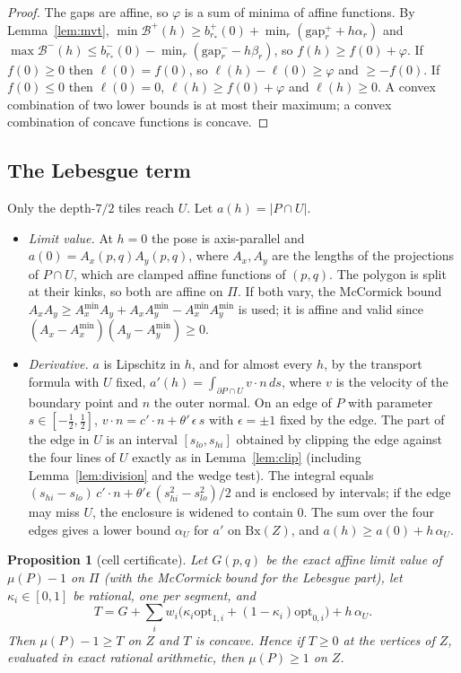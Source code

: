 \documentclass[11pt]{amsart}
\newtheorem{proposition}[theorem]{Proposition}
\theoremstyle{definition}
\theoremstyle{remark}
\newcommand{\gap}{\mathrm{gap}}
\newcommand{\opt}{\mathrm{opt}}
\newcommand{\Bx}{\mathrm{Bx}}
\begin{document}
\begin{proof}
The gaps are affine, so $\varphi$ is a sum of minima of affine functions. By Lemma~\ref{lem:mvt},
$\min\mathcal B^+(h)\ge b^+_{r_*}(0)+\min_r(\gap_r^++h\alpha_r)$ and $\max\mathcal B^-(h)\le
b^-_{r_*}(0)-\min_r(\gap^-_r-h\beta_r)$, so $f(h)\ge f(0)+\varphi$. If $f(0)\ge0$ then $\ell(0)=f(0)$, so
$\ell(h)-\ell(0)\ge\varphi$ and $\ge-f(0)$. If $f(0)\le0$ then $\ell(0)=0$, $\ell(h)\ge f(0)+\varphi$ and
$\ell(h)\ge0$. A convex combination of two lower bounds is at most their maximum; a convex combination of concave
functions is concave.
\end{proof}

\subsection{The Lebesgue term}
Only the depth-$7/2$ tiles reach $U$. Let $a(h)=|P\cap U|$.
\begin{itemize}
\item \emph{Limit value.} At $h=0$ the pose is axis-parallel and $a(0)=A_x(p,q)A_y(p,q)$, where $A_x,A_y$ are the
lengths of the projections of $P\cap U$, which are clamped affine functions of $(p,q)$. The polygon is split at
their kinks, so both are affine on $\Pi$. If both vary, the McCormick bound
$A_xA_y\ge A_x^{\min}A_y+A_xA_y^{\min}-A_x^{\min}A_y^{\min}$ is used; it is affine and valid since
$(A_x-A_x^{\min})(A_y-A_y^{\min})\ge0$.
\item \emph{Derivative.} $a$ is Lipschitz in $h$, and for almost every $h$, by the transport formula with $U$ fixed,
$a'(h)=\int_{\partial P\cap U}v\cdot n\,ds$, where $v$ is the velocity of the boundary point and $n$ the outer normal.
On an edge of $P$ with parameter $s\in[-\frac12,\frac12]$, $v\cdot n=c'\cdot n+\theta'\,\epsilon\,s$ with $\epsilon=\pm1$ fixed by
the edge. The part of the edge in $U$ is an interval $[s_{lo},s_{hi}]$ obtained by clipping the edge against the four
lines of $U$ exactly as in Lemma~\ref{lem:clip} (including Lemma~\ref{lem:division} and the wedge test). The integral
equals $(s_{hi}-s_{lo})\,c'\cdot n+\theta'\epsilon\,(s_{hi}^2-s_{lo}^2)/2$ and is enclosed by intervals; if the edge may miss
$U$, the enclosure is widened to contain $0$. The sum over the four edges gives a lower bound $\alpha_U$ for $a'$ on
$\Bx(Z)$, and $a(h)\ge a(0)+h\,\alpha_U$.
\end{itemize}

\begin{proposition}[cell certificate]\label{prop:cell}
Let $G(p,q)$ be the exact affine limit value of $\mu(P)-1$ on $\Pi$ (with the McCormick bound for the Lebesgue part),
let $\kappa_i\in[0,1]$ be rational, one per segment, and
\[
T=G+\sum_iw_i\bigl(\kappa_i\opt_{1,i}+(1-\kappa_i)\opt_{0,i}\bigr)+h\,\alpha_U .
\]
Then $\mu(P)-1\ge T$ on $Z$ and $T$ is concave. Hence if $T\ge0$ at the vertices of $Z$, evaluated in exact
rational arithmetic, then $\mu(P)\ge1$ on $Z$.
\end{proposition}
\end{document}
